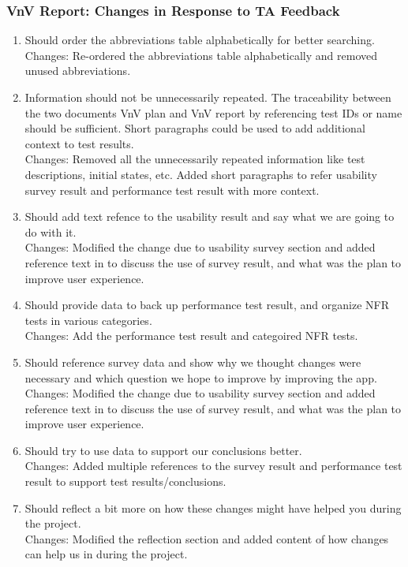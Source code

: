 \documentclass{article}
\begin{document}
\subsubsection{VnV Report: Changes in Response to TA Feedback}
\begin{enumerate}
        \item Should order the abbreviations table alphabetically for better searching. \\
        Changes: Re-ordered the abbreviations table alphabetically and removed unused abbreviations.
        \item Information should not be unnecessarily repeated. The traceability between the two documents VnV plan and VnV report by referencing test IDs or name should be sufficient. Short paragraphs could be used to add additional context to test results. \\
        Changes: Removed all the unnecessarily repeated information like test descriptions, initial states, etc. Added short paragraphs to refer usability survey result and performance test result with more context.
        \item Should add text refence to the usability result and say what we are going to do with it. \\
        Changes: Modified the change due to usability survey section and added reference text in to discuss the use of survey result, and what was the plan to improve user experience.
        \item Should provide data to back up performance test result, and organize NFR tests in various categories. \\
        Changes: Add the performance test result and categoired NFR tests.
        \item Should reference survey data and show why we thought changes were necessary and which question we hope to improve by improving the app.\\
        Changes: Modified the change due to usability survey section and added reference text in to discuss the use of survey result, and what was the plan to improve user experience.
        \item Should try to use data to support our conclusions better.\\
        Changes: Added multiple references to the survey result and performance test result to support test results/conclusions.
        \item Should reflect a bit more on how these changes might have helped you during the project.\\
        Changes: Modified the reflection section and added content of how changes can help us in during the project.
\end{enumerate} 
\end{document}
